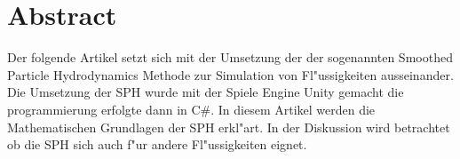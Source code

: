 
\section{Abstract} %
\label{sec:abtract}

Der folgende Artikel setzt sich mit der Umsetzung der %
der sogenannten Smoothed Particle Hydrodynamics Methode %
zur Simulation von Fl"ussigkeiten ausseinander. %
Die Umsetzung der SPH wurde mit der Spiele Engine Unity %
gemacht die programmierung erfolgte dann in C\#. %
In diesem Artikel werden die Mathematischen Grundlagen %
der SPH erkl"art. In der Diskussion wird betrachtet ob %
die SPH sich auch f"ur andere Fl"ussigkeiten eignet.








